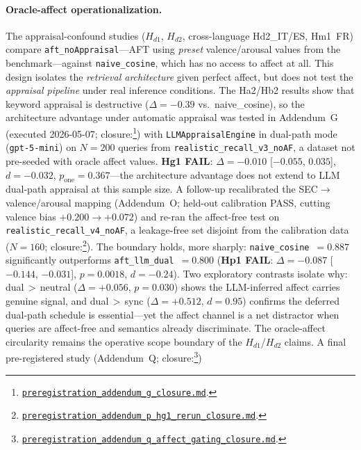 \documentclass[11pt]{article}
\newcommand{\repourl}{https://github.com/gianlucamazza/emotional-memory}%
\begin{document}
\paragraph{Oracle-affect operationalization.}
The appraisal-confound studies ($H_{d1}$, $H_{d2}$, cross-language Hd2\_IT/ES, Hm1~FR)
compare \texttt{aft\_noAppraisal}---AFT using \emph{preset} valence/arousal
values from the benchmark---against \texttt{naive\_cosine}, which has no access
to affect at all. This design isolates the \emph{retrieval architecture} given
perfect affect, but does not test the \emph{appraisal pipeline} under real
inference conditions. The Ha2/Hb2 results show that keyword appraisal
is destructive ($\Delta=-0.39$ vs.\ naive\_cosine), so the architecture
advantage under automatic appraisal was tested in Addendum~G
(executed 2026-05-07; closure:\footnote{%
\href{\repourl/blob/main/benchmarks/preregistration\_addendum\_g\_closure.md}%
{\texttt{preregistration\_addendum\_g\_closure.md}}.})
with \texttt{LLMAppraisalEngine} in dual-path mode (\texttt{gpt-5-mini})
on $N=200$ queries from \texttt{realistic\_recall\_v3\_noAF},
a dataset not pre-seeded with oracle affect values.
\textbf{Hg1 FAIL}: $\Delta=-0.010$ [$-0.055$, $0.035$], $d=-0.032$,
$p_{\text{one}}=0.367$---the architecture advantage does not extend to
LLM dual-path appraisal at this sample size.
A follow-up recalibrated the SEC$\to$valence/arousal mapping (Addendum~O;
held-out calibration PASS, cutting valence bias $+0.200\to+0.072$) and re-ran the
affect-free test on \texttt{realistic\_recall\_v4\_noAF}, a leakage-free set
disjoint from the calibration data ($N=160$; closure:\footnote{%
\href{\repourl/blob/main/benchmarks/preregistration\_addendum\_p\_hg1\_rerun\_closure.md}%
{\texttt{preregistration\_addendum\_p\_hg1\_rerun\_closure.md}}.}).
The boundary holds, more sharply: \texttt{naive\_cosine}~$=0.887$ significantly
outperforms \texttt{aft\_llm\_dual}~$=0.800$ (\textbf{Hp1 FAIL}: $\Delta=-0.087$
[$-0.144$, $-0.031$], $p=0.0018$, $d=-0.24$). Two exploratory contrasts isolate
why: dual\,$>$\,neutral ($\Delta=+0.056$, $p=0.030$) shows the LLM-inferred affect
carries genuine signal, and dual\,$>$\,sync ($\Delta=+0.512$, $d=0.95$) confirms
the deferred dual-path schedule is essential---yet the affect channel is a net
distractor when queries are affect-free and semantics already discriminate.
The oracle-affect circularity remains the operative scope boundary of the
$H_{d1}$/$H_{d2}$ claims.
A final pre-registered study (Addendum~Q; closure:\footnote{%
\href{\repourl/blob/main/benchmarks/preregistration\_addendum\_q\_affect\_gating\_closure.md}%
{\texttt{preregistration\_addendum\_q\_affect\_gating\_closure.md}}.})
\end{document}
